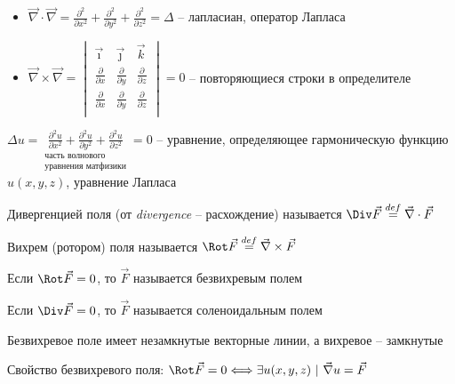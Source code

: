 \documentclass[12pt]{article}
\begin{document}
    \begin{itemize}
        \item $\vec\nabla \cdot \vec\nabla = \frac{\partial^2}{\partial x^2} + \frac{\partial^2}{\partial y^2} + \frac{\partial^2}{\partial z^2} = \Delta$ -- лапласиан, оператор Лапласа

        \item $\vec\nabla \times \vec\nabla = 
        \begin{vmatrix}
            \vec\imath & \vec\jmath & \vec k \\
            \frac{\partial}{\partial x} & \frac{\partial}{\partial y} & \frac{\partial}{\partial z} \\
            \frac{\partial}{\partial x} & \frac{\partial}{\partial y} & \frac{\partial}{\partial z} \\
        \end{vmatrix} = 0$ -- повторяющиеся строки в определителе
    \end{itemize}
    
    \Nota $\Delta u = \underset{\substack{\text{часть волнового}\\ \text{уравнения матфизики}}}{\frac{\partial^2 u}{\partial x^2} + \frac{\partial^2 u}{\partial y^2} + \frac{\partial^2 u}{\partial z^2}} = 0$ -- уравнение, определяющее гармоническую функцию $u(x, y, z)$, уравнение Лапласа

    \hypertarget{divergence}{}

     Дивергенцией поля (от \textit{divergence} -- расхождение) называется
    $\Div \vec{F} \stackrel{def}{=} \vec\nabla \cdot \vec{F}$

    \hypertarget{rotor}{}

     Вихрем (ротором) поля называется $\Rot \vec{F} \stackrel{def}{=} \vec\nabla \times \vec{F}$

    \hypertarget{vectorfieldtypes}{}

     Если $\Rot \vec{F} = 0$, то $\vec{F}$ называется безвихревым полем

     Если $\Div \vec{F} = 0$, то $\vec{F}$ называется соленоидальным полем

    \Notas Безвихревое поле имеет незамкнутые векторные линии, а вихревое -- замкнутые

    \hypertarget{irrotationalfieldproperty}{}

    \begin{MyTheorem}
         Свойство безвихревого поля: $\Rot \vec{F} = 0 \Longleftrightarrow \exists u(x, y, z) \ | \ \vec\nabla u = \vec{F}$
    \end{MyTheorem}
\end{document}
